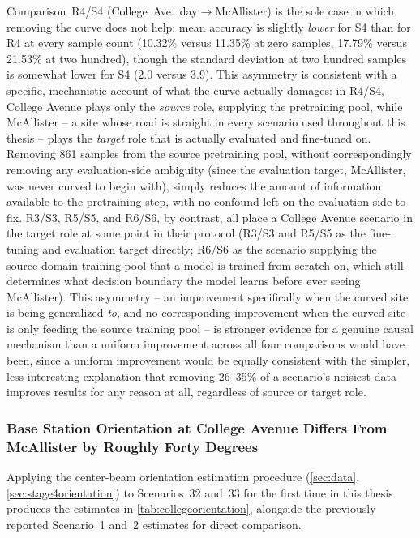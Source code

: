 \documentclass{iutbscthesis}
\begin{document}
Comparison~R4/S4 (College~Ave.\ day$\to$McAllister) is the sole case in which removing the curve does not help: mean accuracy is slightly \emph{lower} for S4 than for R4 at every sample count (10.32\% versus 11.35\% at zero samples, 17.79\% versus 21.53\% at two hundred), though the standard deviation at two hundred samples is somewhat lower for S4 (2.0 versus 3.9). This asymmetry is consistent with a specific, mechanistic account of what the curve actually damages: in R4/S4, College Avenue plays only the \emph{source} role, supplying the pretraining pool, while McAllister -- a site whose road is straight in every scenario used throughout this thesis -- plays the \emph{target} role that is actually evaluated and fine-tuned on. Removing 861 samples from the source pretraining pool, without correspondingly removing any evaluation-side ambiguity (since the evaluation target, McAllister, was never curved to begin with), simply reduces the amount of information available to the pretraining step, with no confound left on the evaluation side to fix. R3/S3, R5/S5, and R6/S6, by contrast, all place a College Avenue scenario in the target role at some point in their protocol (R3/S3 and R5/S5 as the fine-tuning and evaluation target directly; R6/S6 as the scenario supplying the source-domain training pool that a model is trained from scratch on, which still determines what decision boundary the model learns before ever seeing McAllister). This asymmetry -- an improvement specifically when the curved site is being generalized \emph{to}, and no corresponding improvement when the curved site is only feeding the source training pool -- is stronger evidence for a genuine causal mechanism than a uniform improvement across all four comparisons would have been, since a uniform improvement would be equally consistent with the simpler, less interesting explanation that removing 26--35\% of a scenario's noisiest data improves results for any reason at all, regardless of source or target role.

\subsubsection{Base Station Orientation at College Avenue Differs From McAllister by Roughly Forty Degrees}

Applying the center-beam orientation estimation procedure (\autoref{sec:data}, \autoref{sec:stage4orientation}) to Scenarios~32 and~33 for the first time in this thesis produces the estimates in \autoref{tab:collegeorientation}, alongside the previously reported Scenario~1 and~2 estimates for direct comparison.
\end{document}

